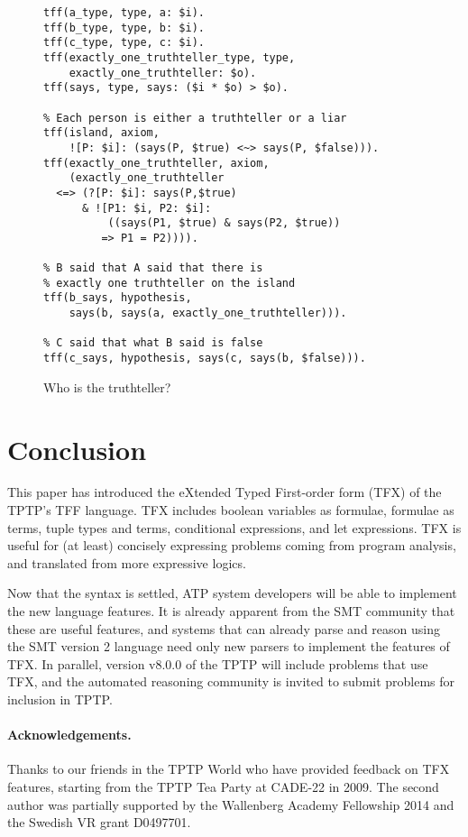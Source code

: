 \begin{figure}[h]
\begin{lstlisting}[language=tptp]
tff(a_type, type, a: $i).
tff(b_type, type, b: $i).
tff(c_type, type, c: $i).
tff(exactly_one_truthteller_type, type,
    exactly_one_truthteller: $o).
tff(says, type, says: ($i * $o) > $o).

% Each person is either a truthteller or a liar
tff(island, axiom,
    ![P: $i]: (says(P, $true) <~> says(P, $false))).
tff(exactly_one_truthteller, axiom,
    (exactly_one_truthteller
  <=> (?[P: $i]: says(P,$true)
      & ![P1: $i, P2: $i]:
          ((says(P1, $true) & says(P2, $true))
         => P1 = P2)))).

% B said that A said that there is
% exactly one truthteller on the island
tff(b_says, hypothesis,
    says(b, says(a, exactly_one_truthteller))).

% C said that what B said is false
tff(c_says, hypothesis, says(c, says(b, $false))).
\end{lstlisting}
\caption{Who is the truthteller?}
\label{fig:tfx/Truthteller}
\end{figure}

\section{Conclusion}
\label{sec:tfx/Conclusion}

This paper has introduced the eXtended Typed First-order form (TFX) of the
TPTP's TFF language.
TFX includes boolean variables as formulae, formulae as terms, tuple types and
terms, conditional expressions, and let expressions.
TFX is useful for (at least) concisely expressing problems coming from 
program analysis, and translated from more expressive logics.

Now that the syntax is settled, ATP system developers will be able to
implement the new language features.
It is already apparent from the SMT community that these are useful features,
and systems that can already parse and reason using the SMT version 2 language 
need only new parsers to implement the features of TFX.
In parallel, version v8.0.0 of the TPTP will include problems that use TFX,
and the automated reasoning community is invited to submit problems for
inclusion in TPTP.

\paragraph{Acknowledgements.}
Thanks to our friends in the TPTP World who have provided feedback on TFX
features, starting from the TPTP Tea Party at CADE-22 in 2009. The second
author was partially supported by the Wallenberg Academy Fellowship 2014 and
the Swedish VR grant D0497701.